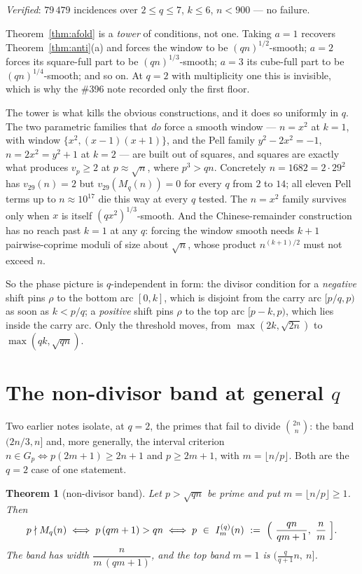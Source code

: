 \documentclass[11pt]{article}
\newtheorem{theorem}{Theorem}
\begin{document}
\emph{Verified}: $79\,479$ incidences over $2\le q\le7$, $k\le6$, $n<900$ --- no failure.

Theorem~\ref{thm:afold} is a \emph{tower} of conditions, not one.  Taking $a=1$ recovers
Theorem~\ref{thm:anti}(a) and forces the window to be $(qn)^{1/2}$-smooth; $a=2$ forces its
square-full part to be $(qn)^{1/3}$-smooth; $a=3$ its cube-full part to be $(qn)^{1/4}$-smooth;
and so on.  At $q=2$ with multiplicity one this is invisible, which is why the \#396 note
recorded only the first floor.

The tower is what kills the obvious constructions, and it does so uniformly in $q$.  The two
parametric families that \emph{do} force a smooth window --- $n=x^{2}$ at $k=1$, with window
$\{x^{2},(x-1)(x+1)\}$, and the Pell family $y^{2}-2x^{2}=-1$, $n=2x^{2}=y^{2}+1$ at $k=2$ ---
are built out of squares, and squares are exactly what produces $v_p\ge2$ at $p\approx\sqrt n$,
where $p^{3}>qn$.  Concretely $n=1682=2\cdot29^{2}$ has $v_{29}(n)=2$ but
$v_{29}(M_q(n))=0$ for every $q$ from $2$ to $14$; all eleven Pell terms up to
$n\approx10^{17}$ die this way at every $q$ tested.  The $n=x^{2}$ family survives only when
$x$ is itself $(qx^{2})^{1/3}$-smooth.  And the Chinese-remainder construction has no reach
past $k=1$ at any $q$: forcing the window smooth needs $k+1$ pairwise-coprime moduli of size
about $\sqrt n$, whose product $n^{(k+1)/2}$ must not exceed $n$.

So the phase picture is $q$-independent in form: the divisor condition for a \emph{negative}
shift pins $\rho$ to the bottom arc $[0,k]$, which is disjoint from the carry arc
$[p/q,p)$ as soon as $k<p/q$; a \emph{positive} shift pins $\rho$ to the top arc
$[p-k,p)$, which lies inside the carry arc.  Only the threshold moves, from
$\max(2k,\sqrt{2n})$ to $\max(qk,\sqrt{qn})$.

\section{The non-divisor band at general $q$}

Two earlier notes isolate, at $q=2$, the primes that fail to divide $\binom{2n}{n}$: the band
$(2n/3,n]$ and, more generally, the interval criterion $n\in G_p\iff p(2m+1)\ge2n+1$ and
$p\ge2m+1$, with $m=\lfloor n/p\rfloor$.  Both are the $q=2$ case of one statement.

\begin{theorem}[non-divisor band]\label{thm:band}
Let $p>\sqrt{qn}$ be prime and put $m=\lfloor n/p\rfloor\ge1$.  Then
\[
  p\nmid M_q(n)
  \iff
  p\,(qm+1)>qn
  \iff
  p\ \in\ I^{(q)}_m(n)\ :=\ \Bigl(\ \frac{qn}{qm+1},\ \frac nm\ \Bigr] .
\]
The band has width $\dfrac{n}{m\,(qm+1)}$, and the top band $m=1$ is
$\bigl(\tfrac{q}{q+1}n,\ n\bigr]$.
\end{theorem}
\end{document}
